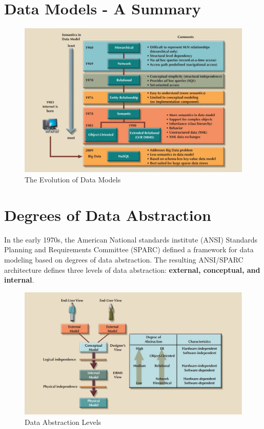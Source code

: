 \documentclass[a4paper, 12pt, titlepage]{report}
\begin{document}
\section{Data Models - A Summary}
\begin{figure}[H]
\centering
\includegraphics[scale=0.5]{DMSummary}
\caption{The Evolution of Data Models}
\end{figure}
\section{Degrees of Data Abstraction}
In the early 1970s, the American National standards institute (ANSI) Standards Planning and Requirements Committee (SPARC) defined a framework for data modeling based on degrees of data abstraction. The resulting ANSI/SPARC architecture defines three levels of data abstraction: \textbf{external, conceptual, and internal}. 
\begin{figure}[H]
\centering
\includegraphics[scale=0.45]{DLAbs}
\caption{Data Abstraction Levels}
\end{figure}
\end{document}
